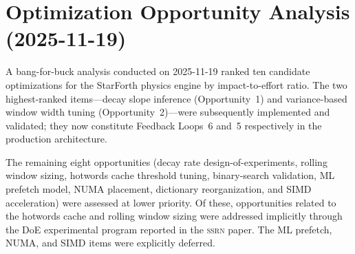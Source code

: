 
\section*{Optimization Opportunity Analysis (2025-11-19)}

A bang-for-buck analysis conducted on 2025-11-19 ranked ten candidate
optimizations for the StarForth physics engine by impact-to-effort ratio.
The two highest-ranked items---decay slope inference (Opportunity~1) and
variance-based window width tuning (Opportunity~2)---were subsequently
implemented and validated; they now constitute Feedback Loops~6 and~5
respectively in the production architecture.

The remaining eight opportunities (decay rate design-of-experiments, rolling
window sizing, hotwords cache threshold tuning, binary-search validation, ML
prefetch model, NUMA placement, dictionary reorganization, and SIMD
acceleration) were assessed at lower priority. Of these, opportunities related
to the hotwords cache and rolling window sizing were addressed implicitly
through the DoE experimental program reported in the \textsc{ssrn} paper.
The ML prefetch, NUMA, and SIMD items were explicitly deferred.

